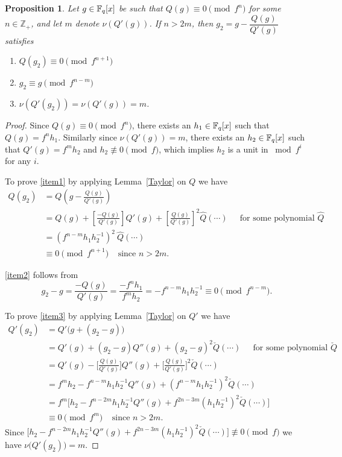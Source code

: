 \documentclass[11pt,reqno]{amsart}
\newtheorem{prop}[thm]{Proposition}
\begin{document}
\begin{prop} \label{Hensel for poly-strong version} 
Let $g \in \Bbb F_q[x]$ be such that $Q(g) \equiv 0 \pmod{f^n}$ for some $n \in \mathbb{Z}_{+}$, and let $m$ denote $\nu (Q'(g))$. If $n > 2m$, then $g_{2}=g-\dfrac{Q(g)}{Q'(g)}$ satisfies
\vspace{-0.3cm}
\begin{enumerate}
\item \label{item1} $Q(g_{2}) \equiv 0 \pmod{f^{n+1}}$
\vspace{-0.3cm}
\item \label{item2} $g_{2} \equiv g \pmod{f^{n-m}}$
\vspace{-0.3cm}
\item \label{item3} $\nu (Q'(g_{2}))= \nu (Q'(g))=m$.
\end{enumerate}
\end{prop}

\begin{proof} 
Since $Q(g) \equiv 0 \pmod{f^n}$, there exists an $h_1 \in \Bbb F_q[x]$ such that $Q(g)=f^{n} h_1$. 
Similarly since $\nu (Q'(g))=m$, there exists an $h_2 \in \Bbb F_q[x] $ such that $Q'(g)=f^{m}h_2$ and $h_2 \not\equiv 0 \pmod{f}$, which implies $h_2$ is a unit in $\bmod{f^i}$ for any $i$.

To prove \eqref{item1} by applying Lemma~\ref{Taylor} on $Q$ we have 
\begin{align*} Q(g_2) &= Q\left(g-\frac{Q(g)}{Q'(g)}\right) \\
&= Q(g)+\left[\frac{-Q(g)}{Q'(g)}\right]Q'(g)+\left[\frac{Q(g)}{Q'(g)}\right]^2 \hat{Q}(\cdots) \ \ \ \ \ \text{ for some polynomial } \hat{Q} \\
&= (f^{n-m} h_1h_2^{-1})^2 \  \hat{Q}(\cdots) \\
&\equiv 0 \pmod{f^{n+1}}  \ \ \ \ \ \text{since } n > 2m.
\end{align*}

\eqref{item2} follows from 
\[g_{2} - g = \frac{-Q(g)}{Q'(g)} = \frac{-f^{n}h_1}{f^{m}h_2} = -f^{n-m}h_1h_2^{-1} \equiv 0 \pmod{f^{n-m}}.\]

To prove \eqref{item3} by applying Lemma~\ref{Taylor} on $Q'$ we have
\begin{align*} Q'(g_2) &= Q' \big( g+(g_2-g) \big) \\
&= Q'(g)+(g_2-g)Q''(g)+(g_2-g)^2 \check{Q}(\cdots) \ \ \ \ \ \text{ for some polynomial } \check{Q} \\
&= Q'(g) - \bigg[ \frac{Q(g)}{Q'(g)} \bigg] Q''(g) + \bigg[ \frac{Q(g)}{Q'(g)} \bigg]^2 \check{Q}(\cdots) \\
&= f^{m}h_2-f^{n-m}h_1h_2^{-1} Q''(g) + (f^{n-m}h_1h_2^{-1})^2  \check{Q}(\cdots) \\
&=f^m \big[ h_2- f^{n-2m}h_1h_2^{-1} Q''(g) + f^{2n-3m} (h_1h_2^{-1})^2 \check{Q}(\cdots)\big] \\ 
&\equiv 0 \pmod{f^{m}}  \ \ \ \ \ \text{since } n > 2m.
\end{align*}
Since $\big[h_2- f^{n-2m}h_1h_2^{-1} Q''(g) + f^{2n-3m} (h_1h_2^{-1})^2 \check{Q}(\cdots)\big] \not\equiv 0\pmod{f}$ we have $\nu \big( Q'(g_2) \big)=m$.
\end{proof}
\end{document}
